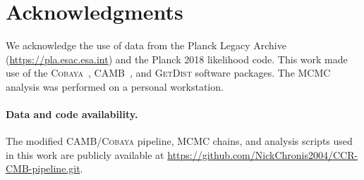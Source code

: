 \documentclass[a4paper,11pt]{article}
\begin{document}






\section*{Acknowledgments}
We acknowledge the use of data from the Planck Legacy Archive
(\url{https://pla.esac.esa.int}) and the Planck 2018 likelihood code.
This work made use of the \textsc{Cobaya}~\cite{Torrado:2021},
\textsc{CAMB}~\cite{Lewis:1999}, and \textsc{GetDist} software packages.
The MCMC analysis was performed on a personal workstation.

\paragraph{Data and code availability.}
The modified \textsc{CAMB}/\textsc{Cobaya} pipeline, MCMC chains,
and analysis scripts used in this work are publicly available at
\url{https://github.com/NickChronis2004/CCR-CMB-pipeline.git}.



\end{document}
